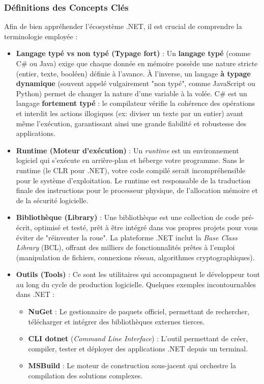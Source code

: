 \subsubsection{Définitions des Concepts Clés}

Afin de bien appréhender l'écosystème .NET, il est crucial de comprendre la terminologie employée :

\begin{itemize}
    \item \textbf{Langage typé vs non typé (Typage fort)} : 
    Un \textbf{langage typé} (comme C\# ou Java) exige que chaque donnée en mémoire possède une nature stricte (entier, texte, booléen) définie à l'avance. À l'inverse, un langage \textbf{à typage dynamique} (souvent appelé vulgairement "non typé", comme JavaScript ou Python) permet de changer la nature d'une variable à la volée. C\# est un langage \textbf{fortement typé} : le compilateur vérifie la cohérence des opérations et interdit les actions illogiques (ex: diviser un texte par un entier) avant même l'exécution, garantissant ainsi une grande fiabilité et robustesse des applications.

    \item \textbf{Runtime (Moteur d'exécution)} : 
    Un \emph{runtime} est un environnement logiciel qui s'exécute en arrière-plan et héberge votre programme. Sans le runtime (le CLR pour .NET), votre code compilé serait incompréhensible pour le système d'exploitation. Le runtime est responsable de la traduction finale des instructions pour le processeur physique, de l'allocation mémoire et de la sécurité logicielle.

    \item \textbf{Bibliothèque (Library)} : 
    Une bibliothèque est une collection de code pré-écrit, optimisé et testé, prêt à être intégré dans vos propres projets pour vous éviter de "réinventer la roue". La plateforme .NET inclut la \emph{Base Class Library} (BCL), offrant des milliers de fonctionnalités prêtes à l'emploi (manipulation de fichiers, connexions réseau, algorithmes cryptographiques).

    \item \textbf{Outils (Tools)} : 
    Ce sont les utilitaires qui accompagnent le développeur tout au long du cycle de production logicielle. Quelques exemples incontournables dans .NET :
    \begin{itemize}
        \item \textbf{NuGet} : Le gestionnaire de paquets officiel, permettant de rechercher, télécharger et intégrer des bibliothèques externes tierces.
        \item \textbf{CLI dotnet} (\emph{Command Line Interface}) : L'outil permettant de créer, compiler, tester et déployer des applications .NET depuis un terminal.
        \item \textbf{MSBuild} : Le moteur de construction sous-jacent qui orchestre la compilation des solutions complexes.
    \end{itemize}


\end{itemize}
